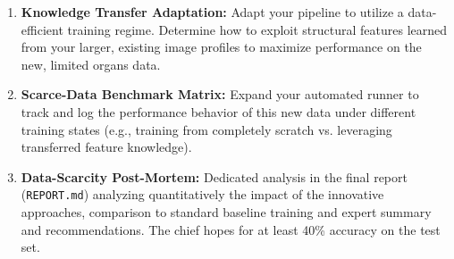 \documentclass[11pt,a4paper]{article}
\begin{document}
\begin{enumerate}
    \item \textbf{Knowledge Transfer Adaptation:} Adapt your pipeline to utilize a data-efficient training regime. Determine how to exploit structural features learned from your larger, existing image profiles to maximize performance on the new, limited organs data.
    \item \textbf{Scarce-Data Benchmark Matrix:} Expand your automated runner to track and log the performance behavior of this new data under different training states (e.g., training from completely scratch vs. leveraging transferred feature knowledge).
    \item \textbf{Data-Scarcity Post-Mortem:} Dedicated analysis in the final report (\texttt{REPORT.md}) analyzing quantitatively the impact of the innovative approaches, comparison to standard baseline training and expert summary and recommendations. The chief hopes for at least 40\% accuracy on the test set. 
\end{enumerate}
\end{document}
